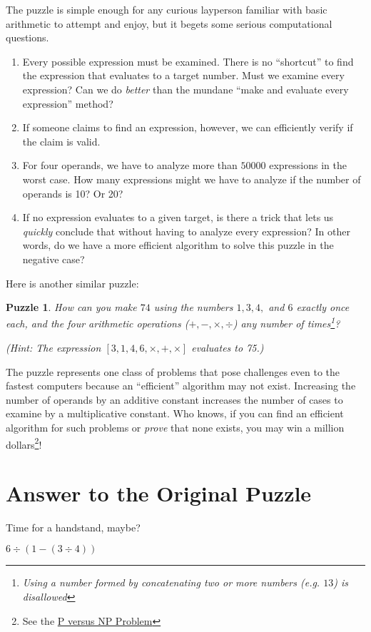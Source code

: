 \documentclass[english,smartquotes]{hgbarticle}
\newtheorem{question}{Puzzle}
\begin{document}
The puzzle is simple enough for any curious layperson familiar with basic arithmetic to attempt and enjoy, but it begets some serious computational questions. 
\begin{enumerate}
\item Every possible expression must be examined. There is no ``shortcut'' to find the expression that evaluates to a target number. Must we examine every expression? Can we do \emph{better} than the mundane ``make and evaluate every expression'' method?

\item If someone claims to find an expression, however, we can efficiently verify if the claim is valid. 

\item For four operands, we have to analyze more than $50000$ expressions in the worst case. How many expressions might we have to analyze if the number of operands is 10? Or 20? 

\item If no expression evaluates to a given target, is there a trick that lets us \emph{quickly} conclude that without having to analyze every expression? In other words, do we have a more efficient algorithm to solve this puzzle in the negative case? 
\end{enumerate}

Here is another similar puzzle:
\begin{question}
\label{puzzle2}
How can you make $74$ using the numbers $1, 3, 4,$ and $6$ exactly once each, and the four arithmetic operations ($+, -, \times, \div$) any number of times\footnote{Using a number formed by concatenating two or more numbers (e.g. $13$) is disallowed}?

({\small Hint: The expression $[3, 1, 4, 6, \times, +, \times]$ evaluates to 75.})

\end{question}

The puzzle represents one class of problems that pose challenges even to the fastest computers because an ``efficient'' algorithm may not exist. Increasing the number of operands by an additive constant increases the number of cases to examine by a multiplicative constant. Who knows, if you can find an efficient algorithm for such problems or \emph{prove} that none exists, you may win a million dollars\footnote{See the \href{https://en.wikipedia.org/wiki/P_versus_NP_problem}{P versus NP Problem}}!

\section{Answer to the Original Puzzle}

Time for a handstand, maybe?

\begin{rotanswer}
$6\div(1-(3\div 4))$
\end{rotanswer}

\printbibliography %

\end{document}
